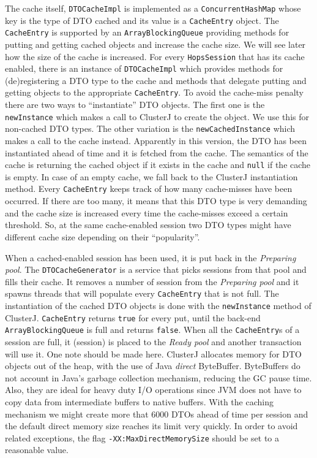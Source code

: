 The cache itself, \texttt{DTOCacheImpl} is implemented as a \texttt{ConcurrentHashMap} whose
key is the type of DTO cached and its value is a \texttt{CacheEntry}
object. The \texttt{CacheEntry} is supported by an
\texttt{ArrayBlockingQueue} providing methods for putting and getting
cached objects and increase the cache size. We will see later how
the size of the cache is increased. For every \texttt{HopsSession}
that has its cache enabled, there is an instance of
\texttt{DTOCacheImpl} which provides methods for (de)registering a DTO
type to the cache and methods that delegate putting and getting objects to the
appropriate \texttt{CacheEntry}. To avoid the cache-miss penalty there are
two ways to ``instantiate'' DTO objects. The first one is the
\texttt{newInstance} which makes a call to ClusterJ to create the
object. We use this for non-cached DTO types. The other variation is
the \texttt{newCachedInstance} which makes a call to the cache
instead. Apparently in this version, the DTO has been instantiated
ahead of time and it is fetched from the cache. The semantics of the
cache is returning the cached object if
it exists in the cache and \texttt{null} if the cache is empty. In
case of an empty cache, we fall back to the ClusterJ instantiation
method. Every \texttt{CacheEntry} keeps track of how many cache-misses
have been occurred. If there are too many, it means that this DTO type
is very demanding and the cache size is increased every time the
cache-misses exceed a certain threshold. So, at the same cache-enabled
session two DTO types might have different cache size depending on
their ``popularity''.

When a cached-enabled session has been used, it is put back in the
\emph{Preparing pool}. The \texttt{DTOCacheGenerator} is a service
that picks sessions from that pool and fills their cache. It removes a
number of session from the \emph{Preparing pool} and it spawns threads
that will populate every \texttt{CacheEntry} that is not
full. The instantiation of the cached DTO objects is done with the
\texttt{newInstance} method of ClusterJ. \texttt{CacheEntry} returns
\texttt{true} for every put, until
the back-end \texttt{ArrayBlockingQueue} is full and returns
\texttt{false}. When all the \texttt{CacheEntry}s of a session are
full, it (session) is placed to the \emph{Ready pool} and another
transaction will use it. One note should be made here. ClusterJ
allocates memory for DTO objects out of the heap, with the use of
Java \emph{direct} ByteBuffer. ByteBuffers do not account in Java's
garbage collection mechanism, reducing the GC pause time. Also, they are ideal
for heavy duty I/O operations since JVM does not have to copy data
from intermediate buffers to native buffers. With the caching
mechanism we might create more that 6000 DTOs ahead of time per
session and the default direct memory size reaches its limit very
quickly. In order to avoid related exceptions, the flag
\texttt{-XX:MaxDirectMemorySize} should be set to a reasonable value.


